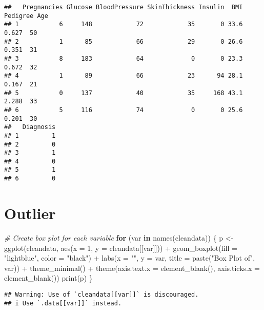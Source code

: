 \documentclass[
]{article}
\newenvironment{Shaded}{\begin{snugshade}}{\end{snugshade}}
\newcommand{\AttributeTok}[1]{\textcolor[rgb]{0.77,0.63,0.00}{#1}}
\newcommand{\CommentTok}[1]{\textcolor[rgb]{0.56,0.35,0.01}{\textit{#1}}}
\newcommand{\ControlFlowTok}[1]{\textcolor[rgb]{0.13,0.29,0.53}{\textbf{#1}}}
\newcommand{\DecValTok}[1]{\textcolor[rgb]{0.00,0.00,0.81}{#1}}
\newcommand{\FunctionTok}[1]{\textcolor[rgb]{0.00,0.00,0.00}{#1}}
\newcommand{\NormalTok}[1]{#1}
\newcommand{\OtherTok}[1]{\textcolor[rgb]{0.56,0.35,0.01}{#1}}
\newcommand{\SpecialCharTok}[1]{\textcolor[rgb]{0.00,0.00,0.00}{#1}}
\newcommand{\StringTok}[1]{\textcolor[rgb]{0.31,0.60,0.02}{#1}}
\begin{document}
\begin{verbatim}
##   Pregnancies Glucose BloodPressure SkinThickness Insulin  BMI Pedigree Age
## 1           6     148            72            35       0 33.6    0.627  50
## 2           1      85            66            29       0 26.6    0.351  31
## 3           8     183            64             0       0 23.3    0.672  32
## 4           1      89            66            23      94 28.1    0.167  21
## 5           0     137            40            35     168 43.1    2.288  33
## 6           5     116            74             0       0 25.6    0.201  30
##   Diagnosis
## 1         1
## 2         0
## 3         1
## 4         0
## 5         1
## 6         0
\end{verbatim}

\hypertarget{outlier}{%
\section{Outlier}\label{outlier}}

\begin{Shaded}
\begin{Highlighting}[]
\CommentTok{\# Create box plot for each variable}
\ControlFlowTok{for}\NormalTok{ (var }\ControlFlowTok{in} \FunctionTok{names}\NormalTok{(cleandata)) \{}
\NormalTok{  p }\OtherTok{\textless{}{-}} \FunctionTok{ggplot}\NormalTok{(cleandata, }\FunctionTok{aes}\NormalTok{(}\AttributeTok{x =} \DecValTok{1}\NormalTok{, }\AttributeTok{y =}\NormalTok{ cleandata[[var]])) }\SpecialCharTok{+}
    \FunctionTok{geom\_boxplot}\NormalTok{(}\AttributeTok{fill =} \StringTok{"lightblue"}\NormalTok{, }\AttributeTok{color =} \StringTok{"black"}\NormalTok{) }\SpecialCharTok{+}
    \FunctionTok{labs}\NormalTok{(}\AttributeTok{x =} \StringTok{""}\NormalTok{, }\AttributeTok{y =}\NormalTok{ var, }\AttributeTok{title =} \FunctionTok{paste}\NormalTok{(}\StringTok{"Box Plot of"}\NormalTok{, var)) }\SpecialCharTok{+}
    \FunctionTok{theme\_minimal}\NormalTok{() }\SpecialCharTok{+}
    \FunctionTok{theme}\NormalTok{(}\AttributeTok{axis.text.x =} \FunctionTok{element\_blank}\NormalTok{(), }\AttributeTok{axis.ticks.x =} \FunctionTok{element\_blank}\NormalTok{())}
  \FunctionTok{print}\NormalTok{(p)}
\NormalTok{\}}
\end{Highlighting}
\end{Shaded}

\begin{verbatim}
## Warning: Use of `cleandata[[var]]` is discouraged.
## i Use `.data[[var]]` instead.
\end{verbatim}
\end{document}
